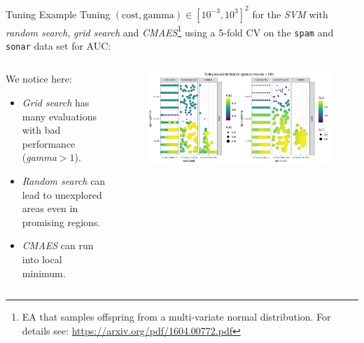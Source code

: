 \begin{frame}{Tuning Example}
Tuning $(\text{cost},\text{gamma}) \in [10^{-3},10^{3}]^2$ for the \emph{SVM} with \emph{random search}, \emph{grid search} and \emph{CMAES}\footnote{EA that samples offspring from a multi-variate normal distribution. For details see: \url{https://arxiv.org/pdf/1604.00772.pdf}} using a 5-fold CV on the \texttt{spam} and \texttt{sonar} data set for AUC:
\begin{columns}
\begin{column}{0.3\textwidth}
  \vspace{1em}
  \footnotesize

  We notice here:
  
  \begin{itemize}
    \item \emph{Grid search} has many evaluations with bad performance (\emph{gamma}$>1$).
    \item \emph{Random search} can lead to unexplored areas even in promising regions. 
    \item \emph{CMAES} can run into local minimum.
  \end{itemize}
\end{column}%
\begin{column}{0.7\textwidth}
  \vspace{-1em}
  \begin{figure}
  \includegraphics[width=\textwidth]{images/benchmark_scatter.png}
  \end{figure}
\end{column}
\end{columns}
\end{frame}

